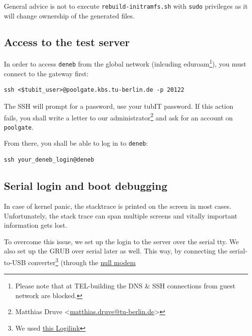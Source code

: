 \documentclass[]{report}
\begin{document}
General advice is not to execute \lstinline!rebuild-initramfs.sh! with
\lstinline!sudo! privileges as it will change ownership of the generated
files.

\subsection{Access to the test server}\label{access-to-the-test-server}

In order to access \lstinline!deneb! from the global network (inlcuding
eduroam\footnote{Please note that at TEL-building the DNS \& SSH
  connections from guest network are blocked.}), you must connect to the
gateway first:

\begin{lstlisting}[style=simple]
ssh <$tubit_user>@poolgate.kbs.tu-berlin.de -p 20122
\end{lstlisting}

The SSH will prompt for a password, use your tubIT password. If this
action fails, you shall write a letter to our administrator\footnote{Matthias
  Druve
  \textless{}\href{mailto:matthias.druve@tu-berlin.de}{matthias.druve@tu-berlin.de}\textgreater{}}
and ask for an account on \lstinline!poolgate!.

From there, you shall be able to log in to \lstinline!deneb!:

\begin{lstlisting}[style=simple]
ssh your_deneb_login@deneb
\end{lstlisting}

\subsection{Serial login and boot
debugging}\label{serial-login-and-boot-debugging}

In case of kernel panic, the stacktrace is printed on the screen in most
cases. Unfortunately, the stack trace can span multiple screens and
vitally important information gets lost.

To overcome this issue, we set up the login to the server over the
serial tty. We also set up the GRUB over serial later as well. This way,
by connecting the serial-to-USB converter\footnote{We used
  \href{http://www.amazon.de/LogiLink-AU0002E-Adapter-unterst\%C3\%BCtzt-Windows/dp/B00CB5WGZO}{this
  Logilink}} (through the
\href{http://www.ebay.com/itm/DB9-Female-F-Null-Modem-Nul-Cross-Serial-RS232cable-gender-changer-Adapter-SHdis-/291410124222}{null
modem}
\end{document}
